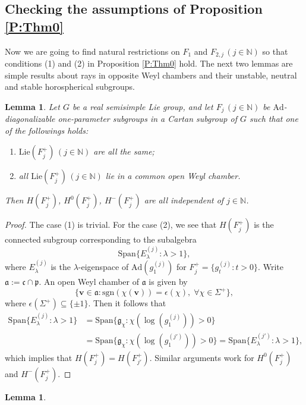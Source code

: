 \documentclass[reqno,12pt]{amsart}
\newtheorem{lemma}[theorem]{Lemma}
\theoremstyle{definition}
\numberwithin{equation}{section}
\newcommand{\NN}{\mathbb{N}}
\newcommand{\bv}{\mathbf{v}}
\newcommand{\Ad}{\mathrm{Ad}}
\newcommand{\Lie}{\mathrm{Lie}}
\newcommand{\Span}{\mathrm{Span}}
\begin{document}
{\subsection{Checking the assumptions of Proposition \ref{P:Thm0}} {Now we are going to find natural restrictions on $F_1$ and $F_{2,j}\,(j\in\NN)$ so that {conditions} (1) and (2) in Proposition \ref{P:Thm0} hold. The next two lemmas are simple results about rays in opposite Weyl chambers and their unstable, neutral and stable horospherical subgroups.
\begin{lemma}\label{L:hind}
    Let $G$ be a real semisimple Lie group, and let $F_j\,(j\in\NN)$ be $\Ad$-diagonalizable one-parameter subgroups in a Cartan subgroup of $G$ such that one of the followings holds:
    \begin{enumerate}
        \item[\rm (1)]  $\Lie(F_j^+)\,(j\in\NN)$ are all the same;
        \item[\rm (2)]  all $\Lie(F_j^+)\,(j\in\NN)$ lie in a common open Weyl chamber.
    \end{enumerate}
    Then $H(F_j^+)$, $H^0(F_j^+)$, $H^-(F_j^+)$ are all independent of $j\in\NN$.
\end{lemma}
\begin{proof}
    The case (1) is trivial. For the case (2), we see that $H(F_j^+)$ is the connected subgroup corresponding to the subalgebra  $$
    \Span\{E^{(j)}_{\lambda}:\lambda>1\},
    $$
    where $E^{(j)}_{\lambda}$ is the $\lambda$-eigenspace of $\Ad(g_1^{(j)})$ for $F_j^+=\{g^{(j)}_{t}:t>0\}$. Write $\mathfrak{a}:=\mathfrak{c}\cap\mathfrak{p}$. An open Weyl chamber of $\mathfrak{a}$ is given by $$
    \{\bv\in\mathfrak{a}:\mathrm{sgn}(\chi(\bv))=\epsilon(\chi),\;\forall \chi\in \Sigma^+\},
    $$
    where $\epsilon(\Sigma^+)\subseteq\{\pm 1\}$. Then it follows that \begin{equation*}
        \begin{aligned}
            \Span\{E^{(j)}_{\lambda}:\lambda>1\}
            &=\Span\{\mathfrak{g}_{\chi}:\chi(\log(g^{(j)}_{1}))>0\}\\
            &=\Span\{\mathfrak{g}_{\chi}:\chi(\log(g^{(j')}_{1}))>0\}
            =\Span\{E^{(j')}_{\lambda}:\lambda>1\},
        \end{aligned}
    \end{equation*}
    which implies that $H(F_j^+)=H(F_{j'}^+)$. Similar arguments work for $H^0(F_j^+)$ and $H^-(F_j^+)$.
\end{proof}
\begin{lemma}\label{L:hopen}

\end{lemma}}}
\end{document}

